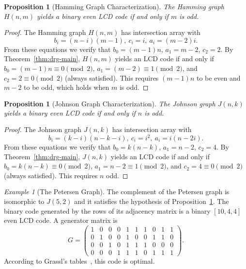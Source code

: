 \documentclass[a4paper,11pt]{article}
\newtheorem{proposition}[theorem]{Proposition}
\theoremstyle{remark}
\newtheorem{example}[theorem]{Example}
\begin{document}
\begin{proposition}[Hamming Graph Characterization]
The Hamming graph $H(n,m)$ yields a binary even LCD code if and only if $m$ is odd.
\end{proposition}

\begin{proof}
The Hamming graph $H(n,m)$ has intersection array with
$$
b_i = (n-i)(m-1),\ c_i = i,\ a_i=(m-2)i.
$$
From these equations we verify that $b_0 = (m-1)n$, $a_1 = m-2$, $c_2 = 2$.
By Theorem~\ref{thm:drg-main}, $H(n,m)$ yields an LCD code if and only if $b_0 = (m-1)n \equiv 0 \pmod 2$, $a_1 = (m-2) \equiv 1 \pmod 2$, and $c_2 = 2 \equiv 0 \pmod 2$ (always satisfied). This requires $(m-1)n$ to be even and $m-2$ to be odd, which holds when $m$ is odd.
\end{proof}

\begin{proposition}[Johnson Graph Characterization]\label{prop:johnson}
The Johnson graph $J(n,k)$ yields a binary even LCD code if and only if $n$ is odd.
\end{proposition}

\begin{proof}
The Johnson graph $J(n,k)$ has intersection array with
$$
b_i = (k-i)(n-k-i),\ c_i=i^2,\ a_i=i(n-2i).
$$
From these equations we verify that $b_0 = k(n-k)$, $a_1 = n-2$, $c_2 = 4$.
By Theorem~\ref{thm:drg-main}, $J(n,k)$ yields an LCD code if and only if $b_0 = k(n-k) \equiv 0 \pmod 2$, $a_1 = n-2 \equiv 1 \pmod 2$, and $c_2 = 4 \equiv 0 \pmod 2$ (always satisfied). This requires $n$ odd.
\end{proof}
\begin{example}[The Petersen Graph]\label{ex:petersen}
The complement of the Petersen graph is isomorphic to $J(5,2)$ and it satisfies the hypothesis of Proposition~\ref{prop:johnson}.
The binary code generated by the rows of its adjacency matrix is a binary $[10,4,4]$ even LCD code.
A generator matrix is
\[
G = \left(\begin{array}{rrrrrrrrrr}
1 & 0 & 0 & 0 & 1 & 1 & 1 & 0 & 1 & 1 \\
0 & 1 & 0 & 0 & 1 & 0 & 0 & 1 & 1 & 0 \\
0 & 0 & 1 & 0 & 1 & 1 & 1 & 0 & 0 & 0 \\
0 & 0 & 0 & 1 & 1 & 1 & 0 & 1 & 1 & 1
\end{array}\right).
\]
According to Grassl's tables~\cite{grassl}, this code is optimal.
\end{example}
\end{document}
